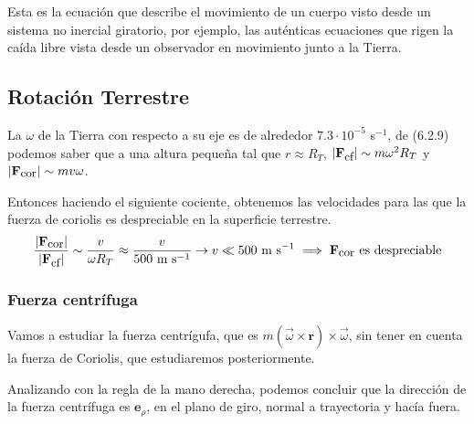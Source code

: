 Esta es la ecuación que describe el movimiento de un cuerpo visto desde un sistema no inercial giratorio, por ejemplo, las auténticas ecuaciones que rigen la caída libre vista desde un observador en movimiento junto a la Tierra.
\subsection{Rotación Terrestre}    
La $\omega$ de la Tierra con respecto a su eje es de alrededor $7.3 \cdot 10^{-5}$ s$^{-1}$, de (6.2.9) podemos saber que a una altura pequeña tal que $r\approx R_T$, $|\mathbf{F}_{\mbox{\small cf}}|\sim m \omega^2 R_T $ y $|\mathbf{F}_{\mbox{\small cor}}|\sim m v \omega$.

Entonces haciendo el siguiente cociente, obtenemos las velocidades para las que la fuerza de coriolis es despreciable en la superficie terrestre.
\begin{equation} \label{6.1.1}
    \frac{|\mathbf{F}_{\mbox{\small cor}}|}{|\mathbf{F}_{\mbox{\small cf}}|} \sim \frac{v}{\omega R_T} \approx \frac{v}{500 \mbox{ m s}^{-1}} \rightarrow v \ll 500 \mbox{ m s}^{-1} \implies \mathbf{F}_{\mbox{\small cor}} \mbox{ es despreciable}
\end{equation} 
\vspace{-20pt}
\subsubsection{Fuerza centrífuga}  
\begin{marginfigure}[0pt]
    \def\svgwidth{3.5 cm}
    \normalsize
	
    \vspace{-30pt}
\end{marginfigure}
Vamos a estudiar la fuerza centrígufa, que es $m\left(\vec{\omega} \times \mathbf{r}\right) \times \vec{\omega}$, sin tener en cuenta la fuerza de Coriolis, que estudiaremos posteriormente.

Analizando con la regla de la mano derecha, podemos concluir que la dirección de la fuerza centrífuga es $\mathbf{e}_\rho$, en el plano de giro, normal a trayectoria y hacía fuera.


